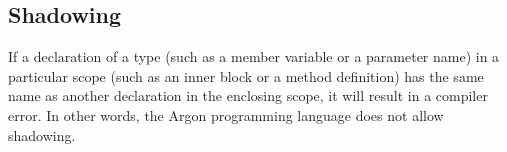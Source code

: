 \subsection{Shadowing}\label{subsec:shadowing}

If a declaration of a type (such as a member variable or a parameter name) in a particular scope (such as an
inner block or a method definition) has the same name as another declaration in the enclosing scope, it will
result in a compiler error. In other words, the Argon programming language does not allow shadowing.
